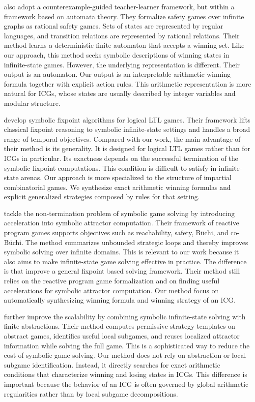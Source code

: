 \documentclass[review]{elsarticle}
\begin{document}
\citet{NeiT2016} also adopt a counterexample-guided teacher-learner framework, but within a framework based on automata theory.
They formalize safety games over infinite graphs as rational safety games.
Sets of states are represented by regular languages, and transition relations are represented by rational relations.
Their method learns a deterministic finite automaton that accepts a winning set.
Like our approach, this method seeks symbolic descriptions of winning states in infinite-state games.
However, the underlying representation is different.
Their output is an automaton.
Our output is an interpretable arithmetic winning formula together with explicit action rules.
This arithmetic representation is more natural for ICGs, whose states are usually described by integer variables and modular structure.

\citet{StaDK2023} develop symbolic fixpoint algorithms for logical LTL games.
Their framework lifts classical fixpoint reasoning to symbolic infinite-state settings and handles a broad range of temporal objectives.
Compared with our work, the main advantage of their method is its generality.
It is designed for logical LTL games rather than for ICGs in particular.
Its exactness depends on the successful termination of the symbolic fixpoint computations.
This condition is difficult to satisfy in infinite-state arenas.
Our approach is more specialized to the structure of impartial combinatorial games.
We synthesize exact arithmetic winning formulas and explicit generalized strategies composed by rules for that setting.

\citet{HeiR2024} tackle the non-termination problem of symbolic game solving by introducing acceleration into symbolic attractor computation.
Their framework of reactive program games supports objectives such as reachability, safety, B\"uchi, and co-B\"uchi.
The method summarizes unbounded strategic loops and thereby improves symbolic solving over infinite domains.
This is relevant to our work because it also aims to make infinite-state game solving effective in practice.
The difference is that \citet{HeiR2024} improve a general fixpoint based solving framework.
Their method still relies on the reactive program game formalization and on finding useful accelerations for symbolic attractor computation.
Our method focus on automatically synthesizing winning formula and winning strategy of an ICG.

\citet{SchHDN2024} further improve the scalability by combining symbolic infinite-state solving with finite abstractions.
Their method computes permissive strategy templates on abstract games, identifies useful local subgames, and reuses localized attractor information while solving the full game.
This is a sophisticated way to reduce the cost of symbolic game solving.
Our method does not rely on abstraction or local subgame identification.
Instead, it directly searches for exact arithmetic conditions that characterize winning and losing states in ICGs.
This difference is important because the behavior of an ICG is often governed by global arithmetic regularities rather than by local subgame decompositions.
\end{document}
